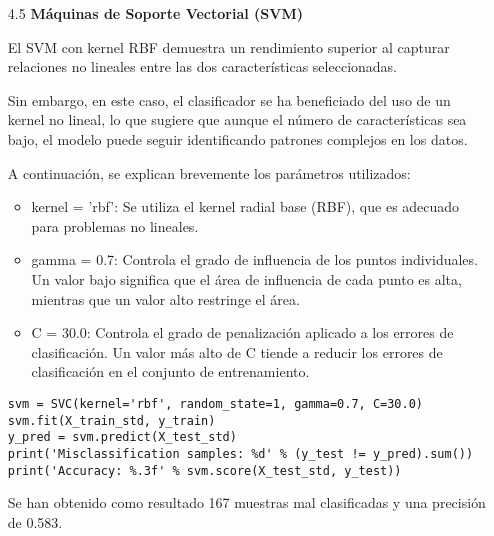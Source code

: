 \documentclass{article}
\begin{document}
\bigskip

\begin{itemize}

\item[4.5]  {\bf M\'aquinas de Soporte Vectorial (SVM)}

El SVM con kernel RBF demuestra un rendimiento superior al capturar relaciones no lineales entre las dos caracter\'isticas seleccionadas.

Sin embargo, en este caso, el clasificador se ha beneficiado del uso de un kernel no lineal, lo que sugiere que aunque el n\'umero de caracter\'isticas sea bajo, el modelo puede seguir identificando patrones complejos en los datos.

A continuaci\'on, se explican brevemente los par\'ametros utilizados:

\begin{itemize}

\item
kernel = 'rbf': Se utiliza el kernel radial base (RBF), que es adecuado para problemas no lineales.

\item
gamma = 0.7: Controla el grado de influencia de los puntos individuales. Un valor bajo significa que el \'area de influencia de cada punto es alta, mientras que un valor alto restringe el \'area.

\item
C = 30.0: Controla el grado de penalizaci\'on aplicado a los errores de clasificaci\'on. Un valor m\'as alto de C tiende a reducir los errores de clasificaci\'on en el conjunto de entrenamiento.

\end{itemize}

\begin{tcolorbox}[width=14cm]
\begin{scriptsize}
\begin{verbatim}
svm = SVC(kernel='rbf', random_state=1, gamma=0.7, C=30.0)
svm.fit(X_train_std, y_train)
y_pred = svm.predict(X_test_std)
print('Misclassification samples: %d' % (y_test != y_pred).sum())
print('Accuracy: %.3f' % svm.score(X_test_std, y_test))
\end{verbatim}
\end{scriptsize}
\end{tcolorbox}

Se han obtenido como resultado 167 muestras mal clasificadas y una precisi\'on de 0.583.

\end{itemize}
\end{document}
